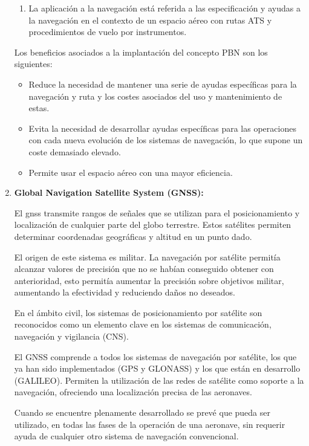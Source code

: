 \begin{enumerate}
\begin{enumerate}
        \item La aplicación a la navegación está referida a las especificación y ayudas a la navegación en el contexto de un espacio aéreo con rutas ATS y procedimientos de vuelo por instrumentos.
    \end{enumerate}
    
    Los beneficios asociados a la implantación del concepto PBN son los siguientes:
    
    \begin{itemize}
        \item Reduce la necesidad de mantener una serie de ayudas específicas para la navegación y ruta y los costes asociados del uso y mantenimiento de estas.
        \item Evita la necesidad de desarrollar ayudas específicas para las operaciones con cada nueva evolución de los sistemas de navegación, lo que supone un coste demasiado elevado.
        \item Permite usar el espacio aéreo con una mayor eficiencia.
    \end{itemize}
    
    \item \textbf{Global Navigation Satellite System (GNSS):}
    
    El \acrfull{gnss} transmite rangos de señales que se utilizan para el posicionamiento y localización de cualquier parte del globo terrestre. Estos satélites permiten determinar coordenadas geográficas y altitud en un punto dado.

    El origen de este sistema es militar. La navegación por satélite permitía alcanzar valores de precisión que no se habían conseguido obtener con anterioridad, esto permitía aumentar la precisión sobre objetivos militar, aumentando la efectividad y reduciendo daños no deseados.
    
    En el ámbito civil, los sistemas de posicionamiento por satélite son reconocidos como un elemento clave en los sistemas de comunicación, navegación y vigilancia (CNS). 
    
    El GNSS comprende a todos los sistemas de navegación por satélite, los que ya han sido implementados (GPS y GLONASS) y los que están en desarrollo (GALILEO). Permiten la utilización de las redes de satélite como soporte a la navegación, ofreciendo una localización precisa de las aeronaves.
    
    Cuando se encuentre plenamente desarrollado se prevé que pueda ser utilizado, en todas las fases de la operación de una aeronave, sin requerir ayuda de cualquier otro sistema de navegación convencional.
    

\end{enumerate}
